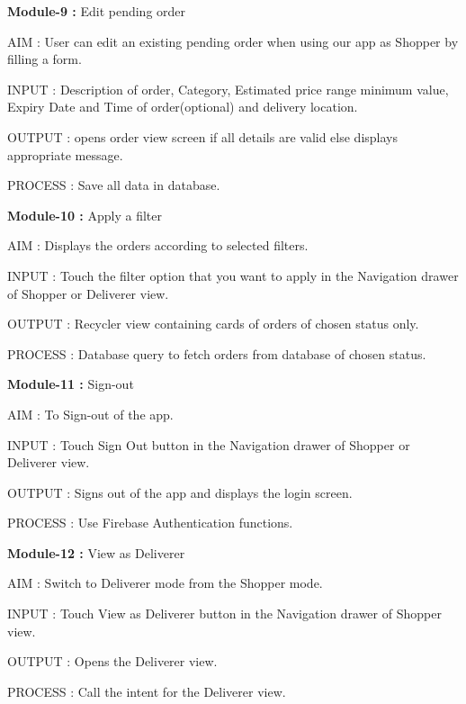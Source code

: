 \documentclass{report}
\begin{document}
\noindent \newline \textbf{Module-9 :} Edit pending order
\begin{description}
\item AIM : User can edit an existing pending order when using our app as Shopper by filling a form.
\item INPUT : Description of order, Category, Estimated price range minimum value, Expiry Date and Time of order(optional) and delivery location.
\item OUTPUT : opens order view screen if all details are valid else displays appropriate message.
\item PROCESS : Save all data in database.
\end{description}

\noindent \newline \textbf{Module-10 :} Apply a filter
\begin{description}
\item AIM : Displays the orders according to selected filters.
\item INPUT : Touch the filter option that you want to apply in the Navigation drawer of Shopper or Deliverer view.
\item OUTPUT : Recycler view containing cards of orders of chosen status only.
\item PROCESS : Database query to fetch orders from database of chosen status.
\end{description}

\noindent \newline \textbf{Module-11 :} Sign-out
\begin{description}
\item AIM : To Sign-out of the app.
\item INPUT : Touch Sign Out button in the Navigation drawer of Shopper or Deliverer view.
\item OUTPUT : Signs out of the app and displays the login screen.
\item PROCESS : Use Firebase Authentication functions.
\end{description}

\noindent \newline \textbf{Module-12 :} View as Deliverer
\begin{description}
\item AIM : Switch to Deliverer mode from the Shopper mode.
\item INPUT : Touch View as Deliverer button in the Navigation drawer of Shopper view.
\item OUTPUT : Opens the Deliverer view.
\item PROCESS : Call the intent for the Deliverer view.
\end{description}
\end{document}
